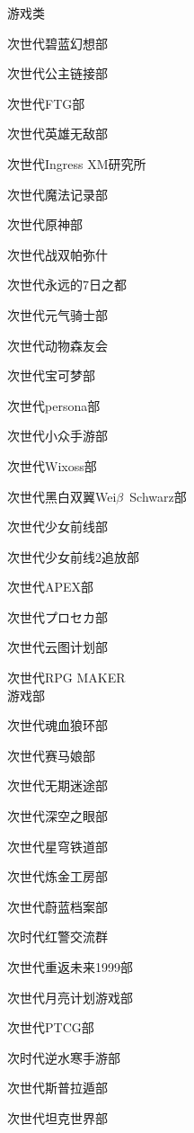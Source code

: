 \begin{multicols}{3}
\begin{categorysection}{游戏类}
        \item 次世代碧蓝幻想部
        \item 次世代公主链接部
        \item 次世代FTG部
        \item 次世代英雄无敌部
        \item 次世代Ingress XM研究所
        \item 次世代魔法记录部
        \item 次世代原神部
        \item 次世代战双帕弥什
        \item 次世代永远的7日之都
        \item 次世代元气骑士部
        \item 次世代动物森友会
        \item 次世代宝可梦部
        \item 次世代persona部
        \item 次世代小众手游部
        \item 次世代Wixoss部
        \item 次世代黑白双翼Wei$\beta$~Schwarz部
        \item 次世代少女前线部
        \item 次世代少女前线2追放部
        \item 次世代APEX部
        \item 次世代プロセカ部
        \item 次世代云图计划部
        \item 次世代RPG MAKER\\游戏部
        \item 次世代魂血狼环部
        \item 次世代赛马娘部
        \item 次世代无期迷途部
        \item 次世代深空之眼部
        \item 次世代星穹铁道部
        \item 次世代炼金工房部
        \item 次世代蔚蓝档案部
        \item 次时代红警交流群
        \item 次世代重返未来1999部
        \item 次世代月亮计划游戏部
        \item 次世代PTCG部
        \item 次时代逆水寒手游部
        \item 次世代斯普拉遁部
        \item 次世代坦克世界部

\end{categorysection}
\end{multicols}
